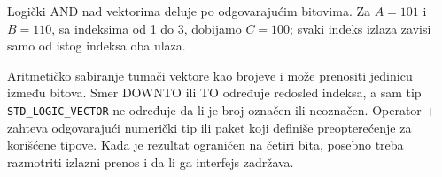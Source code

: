 Logički AND nad vektorima deluje po odgovarajućim bitovima. Za \(A=101\) i \(B=110\), sa indeksima od 1 do 3, dobijamo \(C=100\); svaki indeks izlaza zavisi samo od istog indeksa oba ulaza.

Aritmetičko sabiranje tumači vektore kao brojeve i može prenositi jedinicu između bitova. Smer DOWNTO ili TO određuje redosled indeksa, a sam tip \texttt{STD\_LOGIC\_VECTOR} ne određuje da li je broj označen ili neoznačen. Operator + zahteva odgovarajući numerički tip ili paket koji definiše preopterećenje za korišćene tipove. Kada je rezultat ograničen na četiri bita, posebno treba razmotriti izlazni prenos i da li ga interfejs zadržava.
